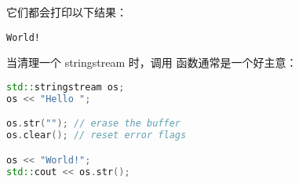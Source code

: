 \documentclass[../../LearnCpp.tex]{subfiles}
\begin{document}
它们都会打印以下结果：

\begin{lstlisting}
World!
\end{lstlisting}

当清理一个 stringstream 时，调用  函数通常是一个好主意：

\begin{lstlisting}[language=C++]
std::stringstream os;
os << "Hello ";

os.str(""); // erase the buffer
os.clear(); // reset error flags

os << "World!";
std::cout << os.str();
\end{lstlisting}
\end{document}
